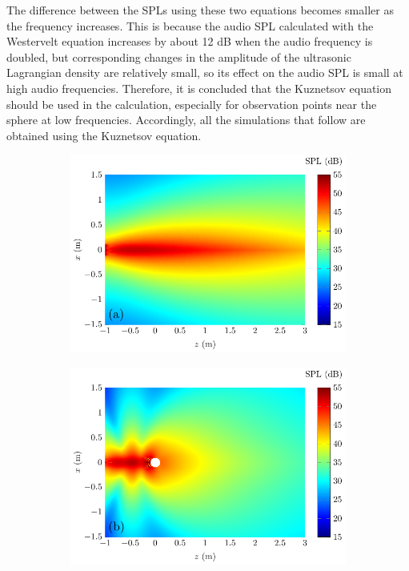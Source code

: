 The difference between the SPLs using these two equations becomes smaller as the frequency increases. 
This is because the audio SPL calculated with the Westervelt equation increases by about 12 dB when the audio frequency is doubled, but corresponding changes in the amplitude of the ultrasonic Lagrangian density are relatively small, so its effect on the audio SPL is small at high audio frequencies. 
Therefore, it is concluded that the Kuznetsov equation should be used in the calculation, especially for observation points near the sphere at low frequencies. 
Accordingly, all the simulations that follow are obtained using the Kuznetsov equation.

\begin{figure}[!htb]
    \centering
    \begin{subfigure}{0.49\textwidth}
        \centering
        \includegraphics[width = \textwidth]{fig/PalNoSphere_2D_211211E_500Hz_211211F.pdf}
    \end{subfigure}
    \begin{subfigure}{0.49\textwidth}
        \centering
        \includegraphics[width = \textwidth]{fig/PalSphere_211205D_Test2D_Kuznetsov_500Hz_211211I.pdf}

\end{subfigure}
\end{figure}
